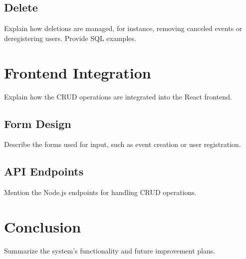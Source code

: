 \documentclass[a4paper]{article}
\begin{document}
\subsection{Delete}
Explain how deletions are managed, for instance, removing canceled events or deregistering users. Provide SQL examples.

\section{Frontend Integration}
Explain how the CRUD operations are integrated into the React frontend.

\subsection{Form Design}
Describe the forms used for input, such as event creation or user registration.

\subsection{API Endpoints}
Mention the Node.js endpoints for handling CRUD operations.

\section{Conclusion}
Summarize the system's functionality and future improvement plans.
\end{document}
